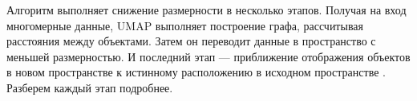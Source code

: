 Алгоритм выполняет снижение размерности в несколько этапов. Получая на вход многомерные данные, UMAP выполняет построение графа, рассчитывая расстояния между объектами. Затем он переводит данные в пространство с меньшей размерностью. И последний этап --- приближение отображения объектов в новом пространстве к истинному расположению в исходном пространстве \cite{umap}. Разберем каждый этап подробнее.